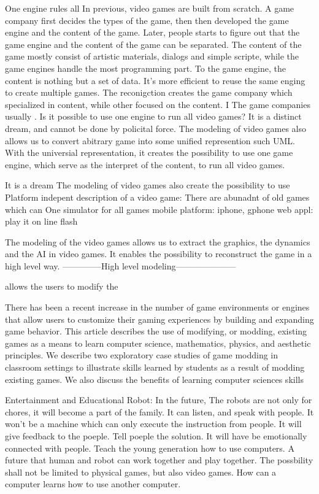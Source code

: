 One engine rules all
In previous, video games are built from scratch. A game company first decides the types of the game,
then then developed the game engine and the content of the game. Later, people starts to figure out 
that the game engine and the content of the game can be separated. The content of the game mostly consist of
artistic materials, dialogs and simple scripte, while the game engines handle the most programming part.
To the game engine, the content is nothing but a set of data. It's more efficient to reuse the same enging
to create multiple games. The reconigction creates the game company which specialized in content, while other
focused on the content. I 
The game companies usually .
Is it possible to use one engine to run all video games?
It is a distinct dream, and cannot be done by policital force.
The modeling of video games also allows us to convert abitrary game into
some unified represention such UML. 
With the universial representation,
it creates the possibility to use one game engine, which serve as the interpret of the content, to run all video games.

It is a dream
The modeling of video games also create the possibility to use 
Platform indepent description of a video game:
There are abunadnt of old games which can 
One simulator for all games
mobile platform: iphone, gphone
web appl: play it on line flash

The modeling of the video games allows us to extract the graphics, the dynamics
and the AI in video games. It enables the possibility to reconstruct the game in 
a high level way. 
--------------High level modeling---------------------


allows the users to modify the 

There has been a recent increase in the number of game environments or engines
that allow users to customize their gaming experiences by building and
expanding game behavior. This article describes the use of modifying, or
modding, existing games as a means to learn computer science, mathematics,
physics, and aesthetic principles. We describe two exploratory case studies of
game modding in classroom settings to illustrate skills learned by students as
a result of modding existing games. We also discuss the benefits of learning
computer sciences skills


Entertainment and Educational Robot:
In the future, 
The robots are not only for chores, it will become a part of the family.
It can listen, and speak with people. 
It won't be a machine which can only execute the instruction from people.
It will give feedback to the poeple. Tell poeple the solution.
It will have be emotionally connected with people.
Teach the young generation how to use computers. 
A future that human and robot can work together and play together.
The possbility shall not be limited to physical games, but also video games.
How can a computer learns how to use another computer.

